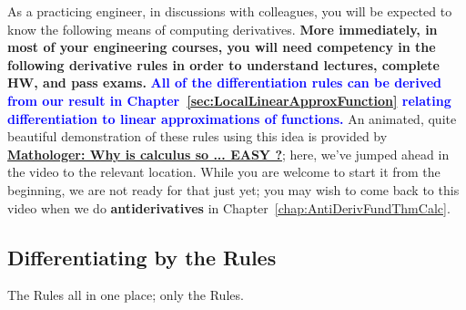 As a practicing engineer, in discussions with colleagues, you will be expected to know the following means of computing derivatives. \textbf{More immediately, in most of your engineering courses, you will need competency in the following derivative rules in order to understand lectures, complete HW, and pass exams.} \textcolor{blue}{\bf All of the differentiation rules can be derived from our result in Chapter~\ref{sec:LocalLinearApproxFunction} relating differentiation to linear approximations of functions.} An animated, quite beautiful demonstration of these rules using this idea is provided by \href{https://youtu.be/kuOxDh3egN0?t=1669}{\bf Mathologer: Why is calculus so ... EASY ?}; here, we've jumped ahead in the video to the relevant location. While you are welcome to start it from the beginning, we are not ready for that just yet; you may wish to come back to this video when we do \textbf{antiderivatives} in Chapter~\ref{chap:AntiDerivFundThmCalc}.

\subsection{Differentiating by the Rules}

The Rules all in one place; only the Rules. 

